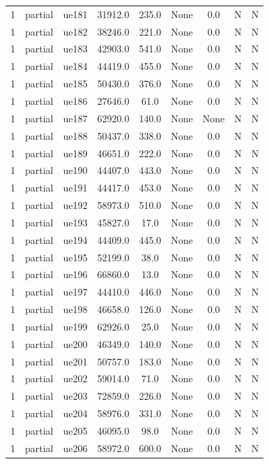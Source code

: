 \begin{table}[ht]
\begin{tabular}{|c|c|c|c|c|c|c|c|c|}
1 & partial & ue181 & 31912.0 & 235.0 & None & 0.0 & N & N \\
1 & partial & ue182 & 38246.0 & 221.0 & None & 0.0 & N & N \\
1 & partial & ue183 & 42903.0 & 541.0 & None & 0.0 & N & N \\
1 & partial & ue184 & 44419.0 & 455.0 & None & 0.0 & N & N \\
1 & partial & ue185 & 50430.0 & 376.0 & None & 0.0 & N & N \\
1 & partial & ue186 & 27646.0 & 61.0 & None & 0.0 & N & N \\
1 & partial & ue187 & 62920.0 & 140.0 & None & None & N & N \\
1 & partial & ue188 & 50437.0 & 338.0 & None & 0.0 & N & N \\
1 & partial & ue189 & 46651.0 & 222.0 & None & 0.0 & N & N \\
1 & partial & ue190 & 44407.0 & 443.0 & None & 0.0 & N & N \\
1 & partial & ue191 & 44417.0 & 453.0 & None & 0.0 & N & N \\
1 & partial & ue192 & 58973.0 & 510.0 & None & 0.0 & N & N \\
1 & partial & ue193 & 45827.0 & 17.0 & None & 0.0 & N & N \\
1 & partial & ue194 & 44409.0 & 445.0 & None & 0.0 & N & N \\
1 & partial & ue195 & 52199.0 & 38.0 & None & 0.0 & N & N \\
1 & partial & ue196 & 66860.0 & 13.0 & None & 0.0 & N & N \\
1 & partial & ue197 & 44410.0 & 446.0 & None & 0.0 & N & N \\
1 & partial & ue198 & 46658.0 & 126.0 & None & 0.0 & N & N \\
1 & partial & ue199 & 62926.0 & 25.0 & None & 0.0 & N & N \\
1 & partial & ue200 & 46349.0 & 140.0 & None & 0.0 & N & N \\
1 & partial & ue201 & 50757.0 & 183.0 & None & 0.0 & N & N \\
1 & partial & ue202 & 59014.0 & 71.0 & None & 0.0 & N & N \\
1 & partial & ue203 & 72859.0 & 226.0 & None & 0.0 & N & N \\
1 & partial & ue204 & 58976.0 & 331.0 & None & 0.0 & N & N \\
1 & partial & ue205 & 46095.0 & 98.0 & None & 0.0 & N & N \\
1 & partial & ue206 & 58972.0 & 600.0 & None & 0.0 & N & N \\

\end{tabular}
\end{table}
